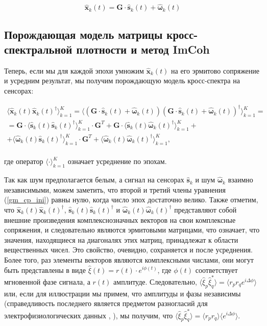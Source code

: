 \begin{equation}
    \hat{\mathbf{x}}_k(t) = \mathbf{G} \cdot \hat{\mathbf{s}}_k(t) + \hat{\mathbf{\omega}}_k(t)
    \label{gm_timefreq_no_fi}
\end{equation}

\subsection{Порождающая модель матрицы кросс-спектральной плотности и метод ImCoh}\label{sec:imcoh}
Теперь, если мы для каждой эпохи умножим $\hat{\mathbf{x}}_k(t)$ на его эрмитово сопряжение и усредним результат,
мы получим порождающую модель кросс-спектра на сенсорах:

\begin{gather}
           \langle{\hat{\mathbf{x}}_k(t) \hat{\mathbf{x}}_k(t)^{\dag}} \rangle_{k=1}^K =
           \langle{(\mathbf{G} \cdot\hat{\mathbf{s}}_k(t) + \hat{\mathbf{\omega}}_k(t))
                                       (\mathbf{G} \cdot\hat{\mathbf{s}}_k(t) + \hat{\mathbf{\omega}}_k(t))^{\dag}}\rangle_{k=1}^K=\nonumber\\
= \mathbf{G}  \cdot \langle{\hat{\mathbf{s     }}_k(t) \hat{\mathbf{s     }}_k(t)^{\dag}} \rangle_{k=1}^K \cdot \mathbf{G}^T +
   \mathbf{G} \cdot \langle{\hat{\mathbf{s     }}_k(t) \hat{\mathbf{\omega}}_k(t)^{\dag}} \rangle_{k=1}^K + \nonumber\\
        +  \langle{\hat{\mathbf{\omega}}_k(t) \hat{\mathbf{s     }}_k(t)^{\dag}} \rangle_{k=1}^K \cdot \mathbf{G}^T +
           \langle{\hat{\mathbf{\omega}}_k(t) \hat{\mathbf{\omega}}_k(t)^{\dag}} \rangle_{k=1}^K,
    \label{gm_cp_ini}
\end{gather}
\\
где оператор $\langle \cdot \rangle_{k=1}^K$ означает усреднение по эпохам.

Так как шум предполагается белым, а сигнал на сенсорах $\hat{\mathbf{s}}_k$ и шум $\hat{\mathbf{\omega}}_k$ взаимно независимыми,
можем заметить, что второй и третий члены уравнения (\ref{gm_cp_ini}) равны нулю, когда число эпох достаточно велико.
Также отметим, что
$\hat{\mathbf{x     }}_k(t) \hat{\mathbf{x     }}_k(t)^{\dag}$,
$\hat{\mathbf{s     }}_k(t) \hat{\mathbf{s     }}_k(t)^{\dag}$ и
$\hat{\mathbf{\omega}}_k(t) \hat{\mathbf{\omega}}_k(t)^{\dag}$
представляют собой внешние произведения комплекснозначных векторов на свои комплексные сопряжения,
и следовательно являются эрмитовыми матрицами, что означает,
что значения, находящиеся на диагоналях этих матриц, принадлежат к области вещественных чисел.
Это свойство, очевидно, сохраняется и после усреднения.
Более того, раз элементы векторов являются комплексными числами, они могут быть представлены в виде
$\hat{\xi}(t) = r(t)\cdot e^{i\phi(t)}$, где $\phi(t)$ соответствует мгновенной фазе сигнала,
а $r(t)$ амплитуде. Следовательно,
$\langle \hat{\xi}_p \hat{\xi}_q^* \rangle = \langle r_p r_q e^{i\Delta\phi} \rangle$ или,
если для иллюстрации мы примем, что амплитуды и фазы независимы
(справедливость последнего является предметом разногласий для электрофизиологических данных \cite{Lachaux1999}, \cite{imcoh}),
мы получим, что
$\langle \hat{\xi}_p \hat{\xi}_q^* \rangle = \langle r_p r_q \rangle \langle e^{i\Delta\phi} \rangle$.

